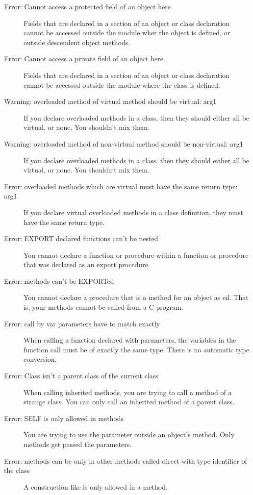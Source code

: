 \begin{description}
\item [Error: Cannot access a protected field of an object here]
 Fields that are declared in a  section of an object or class
 declaration cannot be accessed outside the module wher the object is
 defined, or outside descendent object methods.
\item [Error: Cannot access a private field of an object here]
 Fields that are declared in a  section of an object or class
 declaration cannot be accessed outside the module where the class is
 defined.
\item [Warning: overloaded method of virtual method should be virtual: arg1]
 If you declare overloaded methods in a class, then they should either all be
 virtual, or none. You shouldn't mix them.
\item [Warning: overloaded method of non-virtual method should be non-virtual: arg1]
 If you declare overloaded methods in a class, then they should either all be
 virtual, or none. You shouldn't mix them.
\item [Error: overloaded methods which are virtual must have the same return type: arg1]
 If you declare virtual overloaded methods in a class definition, they must
 have the same return type.
\item [Error: EXPORT declared functions can't be nested]
 You cannot declare a function or procedure within a function or procedure
 that was declared as an export procedure.
\item [Error: methods can't be EXPORTed]
 You cannot declare a procedure that is a method for an object as
 ed. That is, your methods cannot be called from a C program.
\item [Error: call by var parameters have to match exactly]
 When calling a function declared with  parameters, the variables in
 the function call must be of exactly the same type. There is no automatic
 type conversion.
\item [Error: Class isn't a parent class of the current class]
 When calling inherited methods, you are trying to call a method of a strange
 class. You can only call an inherited method of a parent class.
\item [Error: SELF is only allowed in methods]
 You are trying to use the  parameter outside an object's method.
 Only methods get passed the  parameters.
\item [Error: methods can be only in other methods called direct with type identifier of the class]
 A construction like  is only allowed in a method.

\end{description}
